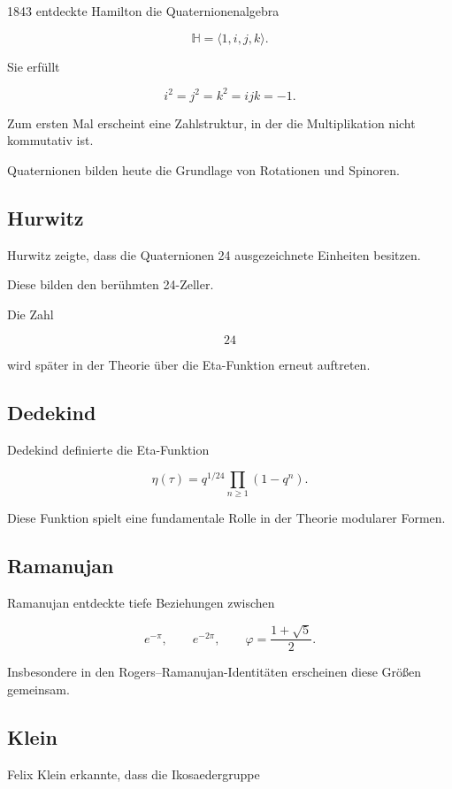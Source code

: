 \documentclass[11pt,a4paper]{article}
\theoremstyle{definition}
\theoremstyle{remark}
\begin{document}
	1843 entdeckte Hamilton die Quaternionenalgebra
	
	\[
	\mathbb H
	=
	\langle 1,i,j,k\rangle.
	\]
	
	Sie erfüllt
	
	\[
	i^2=j^2=k^2=ijk=-1.
	\]
	
	Zum ersten Mal erscheint eine Zahlstruktur,
	in der die Multiplikation nicht kommutativ ist.
	
	Quaternionen bilden heute die Grundlage
	von Rotationen und Spinoren.
	
	\subsection{Hurwitz}
	
	Hurwitz zeigte,
	dass die Quaternionen 24 ausgezeichnete Einheiten besitzen.
	
	Diese bilden den berühmten 24-Zeller.
	
	Die Zahl
	
	\[
	24
	\]
	
	wird später in der Theorie
	über die Eta-Funktion erneut auftreten.
	
	\subsection{Dedekind}
	
	Dedekind definierte die Eta-Funktion
	
	\[
	\eta(\tau)
	=
	q^{1/24}
	\prod_{n\ge1}(1-q^n).
	\]
	
	Diese Funktion spielt eine fundamentale Rolle
	in der Theorie modularer Formen.
	
	\subsection{Ramanujan}
	
	Ramanujan entdeckte tiefe Beziehungen zwischen
	
	\[
	e^{-\pi},
	\qquad
	e^{-2\pi},
	\qquad
	\varphi
	=
	\frac{1+\sqrt5}{2}.
	\]
	
	Insbesondere in den Rogers--Ramanujan-Identitäten
	erscheinen diese Größen gemeinsam.
	
	\subsection{Klein}
	
	Felix Klein erkannte,
	dass die Ikosaedergruppe
	
\end{document}
